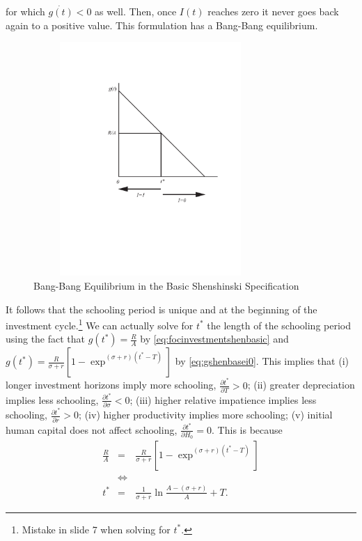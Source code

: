 \noindent for which $\dot{g(t)}<0$ as well. Then, once $I(t)$ reaches zero it never goes back again to a positive value. This formulation has a Bang-Bang equilibrium.

\begin{center}
\begin{figure}[H]
\caption{Bang-Bang Equilibrium in the Basic Shenshinski Specification}
\centering
\includegraphics[width=3.5in, height=3.5in]{Figures/fig-shesh-rule.pdf}
\end{figure}
\end{center}

\indent It follows that the schooling period is unique and at the beginning of the investment cycle.\footnote{Mistake in slide 7 when solving for $t^*$.} We can actually solve for $t^*$ the length of the schooling period using the fact that $g(t^*) = \frac{R}{A} $ by \eqref{eq:focinvestmentshenbasic} and $g(t^*) = \frac{R}{\sigma + r} \left[1 - \exp^{(\sigma + r)(t^*-T)} \right]$ by \eqref{eq:gshenbasei0}. This implies that (i) longer investment horizons imply more schooling, $\frac{\partial t^*}{\partial T} > 0$; (ii) greater depreciation implies less schooling, $\frac{\partial t^*}{\partial \sigma} < 0$; (iii) higher relative impatience implies less schooling, $\frac{\partial t^*}{\partial r} > 0$; (iv) higher productivity implies more schooling; (v) initial human capital does not affect schooling, $\frac{\partial t^*}{\partial H_{0}} = 0$. This is because
\begin{eqnarray}
\frac{R}{A} &=& \frac{R}{\sigma + r} \left[1 - \exp^{(\sigma + r)(t^*-T)} \right] \nonumber \\
&\Leftrightarrow& \nonumber \\ 
t^* &=& \frac{1}{\sigma + r} \ln \frac{A - (\sigma + r) }{A} + T.
\end{eqnarray}

